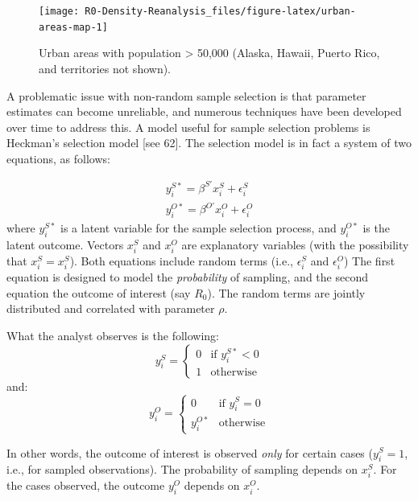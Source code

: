 \documentclass[10pt,letterpaper]{article}
\begin{document}
\begin{figure}
\texttt{[image: R0-Density-Reanalysis\_files/figure-latex/urban-areas-map-1]} \caption{\label{fig:urban-areas-map}Urban areas with population > 50,000 (Alaska, Hawaii, Puerto Rico, and territories not shown).}\label{fig:urban-areas-map}
\end{figure}

A problematic issue with non-random sample selection is that parameter
estimates can become unreliable, and numerous techniques have been
developed over time to address this. A model useful for sample selection
problems is Heckman's selection model {[}see 62{]}. The selection model
is in fact a system of two equations, as follows:

\[
\begin{array}{c}
y_i^{S*} = \beta^{S\prime}x_i^S+\epsilon_i^S\\
y_i^{O*} = \beta^{O\prime}x_i^O+\epsilon_i^O
\end{array}
\] \noindent where \(y_i^{S*}\) is a latent variable for the sample
selection process, and \(y_i^{O*}\) is the latent outcome. Vectors
\(x_i^S\) and \(x_i^O\) are explanatory variables (with the possibility
that \(x_i^S = x_i^S\)). Both equations include random terms (i.e.,
\(\epsilon_i^S\) and \(\epsilon_i^O\)) The first equation is designed to
model the \emph{probability} of sampling, and the second equation the
outcome of interest (say \(R_0\)). The random terms are jointly
distributed and correlated with parameter \(\rho\).

What the analyst observes is the following: \[
y_i^S =
\begin{cases}
0 & \text{if } y_i^{S*} < 0\\
1 & \text{otherwise}
\end{cases}
\] \noindent and: \[
y_i^O =
\begin{cases}
0 & \text{if } y_i^{S} = 0\\
y_i^{O*} & \text{otherwise}
\end{cases}
\]

In other words, the outcome of interest is observed \emph{only} for
certain cases (\(y_i^S=1\), i.e., for sampled observations). The
probability of sampling depends on \(x_i^S\). For the cases observed,
the outcome \(y_i^O\) depends on \(x_i^O\).
\end{document}
